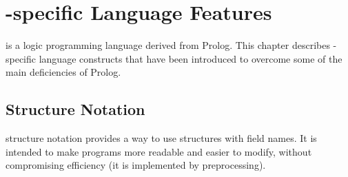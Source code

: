 %
% 
% 
% 
% 
%
%
%

\chapter{\eclipse-specific Language Features}
\label{chaplanguage}

{\eclipse} is a logic programming language derived from Prolog.
This chapter describes \eclipse-specific language constructs
that have been introduced to overcome some of the main deficiencies
of Prolog.

\section{Structure Notation}
\label{chapstruct}

{\eclipse} structure notation provides a way to use structures with field names.
It is intended to make programs more readable and easier
to modify, without compromising efficiency
(it is implemented by preprocessing).

